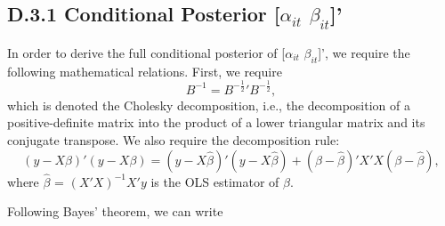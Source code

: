 \subsection*{D.3.1 \hspace{0.1cm} Conditional Posterior [$\alpha_{it}$ $\beta_{it}$]'} 
 In order to derive the full conditional posterior of [$\alpha_{it}$ $\beta_{it}$]', we require the following mathematical relations.
First, we require
\begin{equation}
\label{choleski}
B^{-1} = B^{-\frac{1}{2}}' B^{-\frac{1}{2}},
\end{equation}
 which is denoted the Cholesky decomposition, i.e., the decomposition of a positive-definite matrix into the product of a lower triangular matrix and its conjugate transpose. We also require the decomposition rule:
 \begin{equation}
     \label{decompostion}
     (y-X\beta)'(y-X\beta) = (y-X\hat{\beta})'(y-X\hat{\beta})+ (\beta-\hat{\beta})'X'X(\beta-\hat{\beta}),
 \end{equation}
 where $\hat{\beta}$ = $(X'X)^{-1}X'y$ is the OLS estimator of $\beta$.
 \par Following Bayes' theorem, we can write
